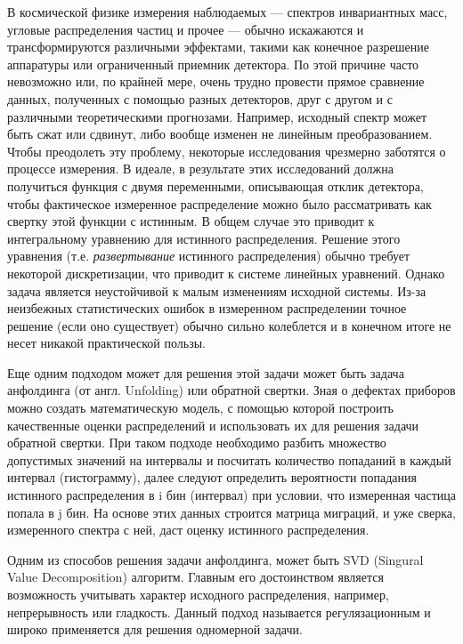 \documentclass[a4paper,12pt]{diplom}
\begin{document}
\tableofcontents[Содержание]



В космической физике измерения наблюдаемых — спектров инвариантных масс, угловые распределения частиц и прочее — обычно искажаются 
и трансформируются различными эффектами, такими как конечное разрешение аппаратуры или ограниченный приемник детектора. По этой причине 
часто невозможно или, по крайней мере, очень трудно провести прямое сравнение данных, полученных с помощью разных детекторов, друг с другом 
и с различными теоретическими прогнозами. Например, исходный спектр может быть сжат или сдвинут, либо вообще изменен не линейным преобразованием. 
Чтобы преодолеть эту проблему, некоторые исследования чрезмерно заботятся о процессе измерения. В идеале, в результате этих исследований должна 
получиться функция с двумя переменными, описывающая отклик детектора, чтобы фактическое измеренное распределение можно было рассматривать как 
свертку этой функции с истинным. В общем случае это приводит к интегральному уравнению для истинного распределения. Решение этого уравнения 
(т.е. \textit{развертывание} истинного распределения) обычно требует некоторой дискретизации, что приводит к системе линейных уравнений. 
Однако задача является неустойчивой к малым изменениям исходной системы. Из-за неизбежных статистических  ошибок в измеренном распределении 
точное решение (если оно существует) обычно сильно колеблется и в конечном итоге не несет никакой практической пользы. 

Еще одним подходом может для решения этой задачи может быть задача анфолдинга (от англ. Unfolding) или обратной свертки. Зная о дефектах 
приборов можно создать математическую модель, с помощью которой построить качественные оценки распределений и использовать их для решения 
задачи обратной свертки. При таком подходе необходимо разбить множество допустимых значений на интервалы и посчитать  количество попаданий 
в каждый интервал (гистограмму), далее следуют определить вероятности попадания истинного распределения в i бин (интервал) 
при условии, что измеренная частица попала в j бин. На основе этих данных строится матрица миграций, и уже сверка, измеренного спектра с ней, 
даст оценку истинного распределения.

Одним из способов решения задачи анфолдинга, может быть SVD (Singural Value Decomposition) алгоритм. Главным его достоинством является
возможность учитывать характер исходного распределения, например, непрерывность или гладкость. Данный подход называется регулязационным
и широко применяется для решения одномерной задачи.
\end{document}
